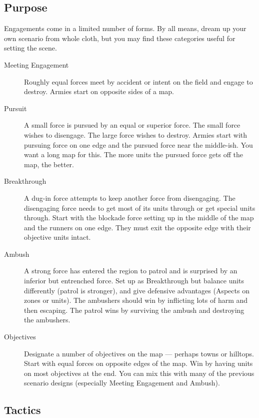 \subsection{Purpose}
\label{sec:platoon-combat-purpose}

Engagements come in a limited number of forms. By all means, dream up your own scenario from whole cloth, but you may find these categories useful for setting the scene.

\begin{description}
\item[Meeting Engagement]
Roughly equal forces meet by accident or intent on the field and engage to destroy. Armies start on opposite sides of a map.

\item[Pursuit]
A small force is pursued by an equal or superior force. The small force wishes to disengage. The large force wishes to destroy. Armies start with pursuing force on one edge and the pursued force near the middle-ish. You want a long map for this. The more units the pursued force gets off the map, the better.

\item[Breakthrough]
A dug-in force attempts to keep another force from disengaging. The disengaging force needs to get most of its units through or get special units through. Start with the blockade force setting up in the middle of the map and the runners on one edge. They must exit the opposite edge with their objective units intact.

\item[Ambush]
A strong force has entered the region to patrol and is surprised by an inferior but entrenched force. Set up as Breakthrough but balance units differently (patrol is stronger), and give defensive advantages (Aspects on zones or units). The ambushers should win by inflicting lots of harm and then escaping. The patrol wins by surviving the ambush and destroying the ambushers.

\item[Objectives]
Designate a number of objectives on the map --- perhaps towns or hilltops. Start with equal forces on opposite edges of the map. Win by having units on most objectives at the end. You can mix this with many of the previous scenario designs (especially Meeting Engagement and Ambush).
\end{description}

\subsection{Tactics}\label{sec:platoon-combat-tactics}

